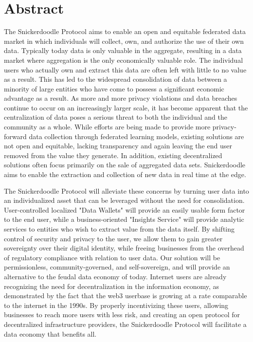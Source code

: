 \section{Abstract}

The Snickerdoodle Protocol aims to enable an open and equitable federated data market in which individuals will collect, own, and authorize the use of their own data. Typically today data is only valuable in the aggregate, resulting in a data market where aggregation is the only economically valuable role. The individual users who actually own and extract this data are often left with little to no value as a result. This has led to the widespread consolidation of data between a minority of large entities who have come to possess a significant economic advantage as a result. As more and more privacy violations and data breaches continue to occur on an increasingly larger scale, it has become apparent that the centralization of data poses a serious threat to both the individual and the community as a whole. While efforts are being made to provide more privacy-forward data collection through federated learning models, existing solutions are not open and equitable, lacking transparency and again leaving the end user removed from the value they generate. In addition, existing decentralized solutions often focus primarily on the sale of aggregated data sets. Snickerdoodle aims to enable the extraction and collection of new data in real time at the edge.

The Snickerdoodle Protocol will alleviate these concerns by turning user data into an individualized asset that can be leveraged without the need for consolidation. User-controlled localized "Data Wallets" will provide an easily usable form factor to the end user, while a business-oriented "Insights Service" will provide analytic services to entities who wish to extract value from the data itself. By shifting control of security and privacy to the user, we allow them to gain greater sovereignty over their digital identity, while freeing businesses from the overhead of regulatory compliance with relation to user data. Our solution will be permissionless, community-governed, and self-sovereign, and will provide an alternative to the feudal data economy of today. Internet users are already recognizing the need for decentralization in the information economy, as demonstrated by the fact that the web3 userbase is growing at a rate comparable to the internet in the 1990s. By properly incentivizing these users, allowing businesses to reach more users with less risk, and creating an open protocol for decentralized infrastructure providers, the Snickerdoodle Protocol will facilitate a data economy that benefits all. 